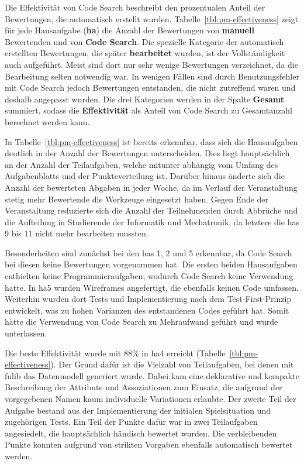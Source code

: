 Die Effektivität von Code Search beschreibt den prozentualen Anteil der Bewertungen, die automatisch erstellt wurden.
Tabelle~\ref{tbl:pm-effectiveness} zeigt für jede Hausaufgabe (\textbf{\acs{ha}}) die Anzahl der Bewertungen von \textbf{manuell} Bewertenden und von \textbf{Code Search}.
Die spezielle Kategorie der automatisch erstellten Bewertungen, die später \textbf{bearbeitet} wurden, ist der Vollständigkeit auch aufgeführt.
Meist sind dort nur sehr wenige Bewertungen verzeichnet, da die Bearbeitung selten notwendig war.
In wenigen Fällen sind durch Benutzungsfehler mit Code Search jedoch Bewertungen entstanden, die nicht zutreffend waren und deshalb angepasst wurden.
Die drei Kategorien werden in der Spalte \textbf{Gesamt} summiert, sodass die \textbf{Effektivität} als Anteil von Code Search zu Gesamtanzahl berechnet werden kann.

In Tabelle~\ref{tbl:pm-effectiveness} ist bereits erkennbar, dass sich die Hausaufgaben deutlich in der Anzahl der Bewertungen unterscheiden.
Dies liegt hauptsächlich an der Anzahl der Teilaufgaben, welche mitunter abhängig vom Umfang des Aufgabenblatts und der Punkteverteilung ist.
Darüber hinaus änderte sich die Anzahl der bewerteten Abgaben in jeder Woche, da im Verlauf der Veranstaltung stetig mehr Bewertende die Werkzeuge eingesetzt haben.
Gegen Ende der Veranstaltung reduzierte sich die Anzahl der Teilnehmenden durch Abbrüche und die Aufteilung in Studierende der Informatik und Mechatronik, da letztere die \acp{ha} 9 bis 11 nicht mehr bearbeiten mussten.

Besonderheiten sind zunächst bei den \acp{ha} 1, 2 und 5 erkennbar, da Code Search bei diesen keine Bewertungen vorgenommen hat.
Die ersten beiden Hausaufgaben enthielten keine Programmieraufgaben, wodurch Code Search keine Verwendung hatte.
In \ac{ha}5 wurden Wireframes angefertigt, die ebenfalls keinen Code umfassen.
Weiterhin wurden dort Tests und Implementierung nach dem Test-First-Prinzip entwickelt, was zu hohen Varianzen des entstandenen Codes geführt hat.
Somit hätte die Verwendung von Code Search zu Mehraufwand geführt und wurde unterlassen.

Die beste Effektivität wurde mit 88\% in \ac{ha}4 erreicht (Tabelle~\ref{tbl:pm-effectiveness}).
Der Grund dafür ist die Vielzahl von Teilaufgaben, bei denen mit fulib das Datenmodell generiert wurde.
Dabei kam eine deklarative und kompakte Beschreibung der Attribute und Assoziationen zum Einsatz, die aufgrund der vorgegebenen Namen kaum individuelle Variationen erlaubte.
Der zweite Teil der Aufgabe bestand aus der Implementierung der initialen Spielsituation und zugehörigen Tests.
Ein Teil der Punkte dafür war in zwei Teilaufgaben angesiedelt, die hauptsächlich händisch bewertet wurden.
Die verbleibenden Punkte konnten aufgrund von strikten Vorgaben ebenfalls automatisch bewertet werden.


